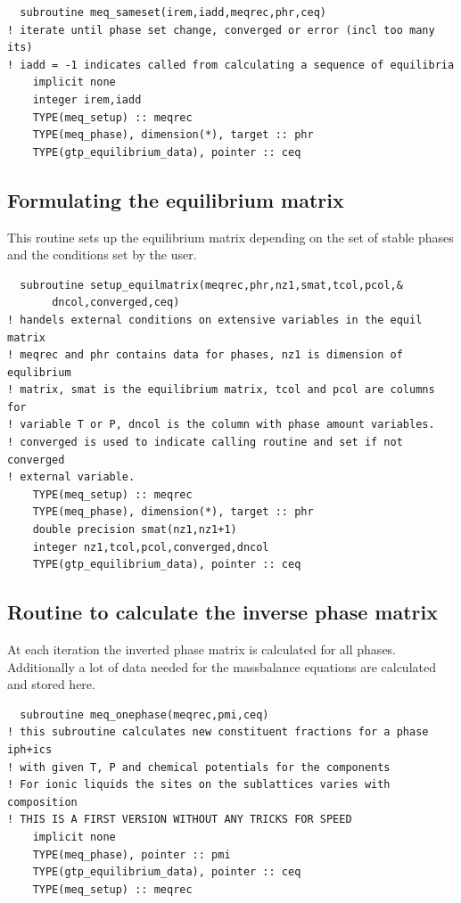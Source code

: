 \documentclass[12pt]{article}
\begin{document}
{\small
\begin{verbatim}
  subroutine meq_sameset(irem,iadd,meqrec,phr,ceq)
! iterate until phase set change, converged or error (incl too many its)
! iadd = -1 indicates called from calculating a sequence of equilibria
    implicit none
    integer irem,iadd
    TYPE(meq_setup) :: meqrec
    TYPE(meq_phase), dimension(*), target :: phr
    TYPE(gtp_equilibrium_data), pointer :: ceq
\end{verbatim}
}

\subsection{Formulating the equilibrium matrix}

This routine sets up the equilibrium matrix depending on the set of
stable phases and the conditions set by the user.

{\small
\begin{verbatim}
  subroutine setup_equilmatrix(meqrec,phr,nz1,smat,tcol,pcol,&
       dncol,converged,ceq)
! handels external conditions on extensive variables in the equil matrix
! meqrec and phr contains data for phases, nz1 is dimension of equlibrium
! matrix, smat is the equilibrium matrix, tcol and pcol are columns for
! variable T or P, dncol is the column with phase amount variables.
! converged is used to indicate calling routine and set if not converged
! external variable.
    TYPE(meq_setup) :: meqrec
    TYPE(meq_phase), dimension(*), target :: phr
    double precision smat(nz1,nz1+1)
    integer nz1,tcol,pcol,converged,dncol
    TYPE(gtp_equilibrium_data), pointer :: ceq
\end{verbatim}
}

\subsection{Routine to calculate the inverse phase matrix}

At each iteration the inverted phase matrix is calculated for all
phases.  Additionally a lot of data needed for the massbalance
equations are calculated and stored here.

{\small
\begin{verbatim}
  subroutine meq_onephase(meqrec,pmi,ceq)
! this subroutine calculates new constituent fractions for a phase iph+ics
! with given T, P and chemical potentials for the components
! For ionic liquids the sites on the sublattices varies with composition
! THIS IS A FIRST VERSION WITHOUT ANY TRICKS FOR SPEED
    implicit none
    TYPE(meq_phase), pointer :: pmi
    TYPE(gtp_equilibrium_data), pointer :: ceq
    TYPE(meq_setup) :: meqrec
\end{verbatim}
}
\end{document}
